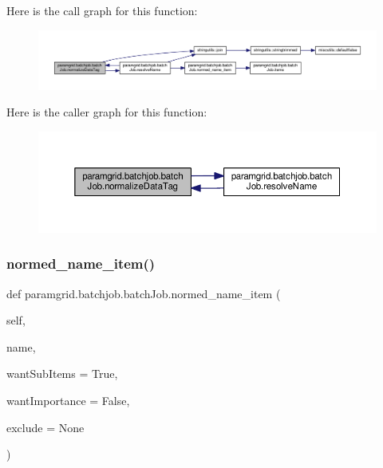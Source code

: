 Here is the call graph for this function\+:
\nopagebreak
\begin{figure}[H]
\begin{center}
\leavevmode
\includegraphics[width=350pt]{classparamgrid_1_1batchjob_1_1batchJob_ac738cf079fd0567111d2ce1e591ff2f5_cgraph}
\end{center}
\end{figure}
Here is the caller graph for this function\+:
\nopagebreak
\begin{figure}[H]
\begin{center}
\leavevmode
\includegraphics[width=350pt]{classparamgrid_1_1batchjob_1_1batchJob_ac738cf079fd0567111d2ce1e591ff2f5_icgraph}
\end{center}
\end{figure}
\mbox{\label{classparamgrid_1_1batchjob_1_1batchJob_addf95d44a88f0ec1a4cfaaa7fae91694}} 
\subsubsection{\texorpdfstring{normed\+\_\+name\+\_\+item()}{normed\_name\_item()}}
{\footnotesize\ttfamily def paramgrid.\+batchjob.\+batch\+Job.\+normed\+\_\+name\+\_\+item (\begin{DoxyParamCaption}\item[{}]{self,  }\item[{}]{name,  }\item[{}]{want\+Sub\+Items = {\ttfamily True},  }\item[{}]{want\+Importance = {\ttfamily False},  }\item[{}]{exclude = {\ttfamily None} }\end{DoxyParamCaption})}



